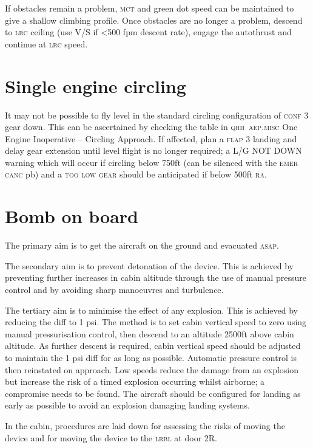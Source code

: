 \documentclass[a5paper,11pt,twoside]{book}
\newcommand{\ac}[1]{{\scshape\MakeLowercase{#1}}}
\newcommand{\inlcite}[1]{{\ac{#1}}}
\newcommand{\multicite}[1]{%
  \nopagebreak
  \noindent{{\color{blue}\footnotesize[ \inlcite{#1} ]}}
}
\begin{document}
If obstacles remain a problem, \ac{MCT} and green dot speed can be maintained to
give a shallow climbing profile. Once obstacles are no longer a problem, descend
to \ac{LRC} ceiling (use V/S if <500 fpm descent rate), engage the autothrust
and continue at \ac{LRC} speed.

\multicite{FCTM~PRO.AEP.ENG.EFDC}
\section{Single engine circling}

It may not be possible to fly level in the standard circling configuration of
\ac{CONF} 3 gear down. This can be ascertained by checking the table in
\inlcite{QRH~AEP.MISC} One Engine Inoperative – Circling Approach. If affected,
plan a \ac{FLAP} 3 landing and delay gear extension until level flight is no
longer required; a L/G NOT DOWN warning which will occur if circling below 750ft
(can be silenced with the \ac{EMER CANC} pb) and a \ac{TOO LOW GEAR} should be
anticipated if below 500ft \ac{RA}.

\multicite{QRH~AEP.MISC}

\section{Bomb on board}

The primary aim is to get the aircraft on the ground and evacuated \ac{ASAP}.

The secondary aim is to prevent detonation of the device. This is achieved by
preventing further increases in cabin altitude through the use of manual
pressure control and by avoiding sharp manoeuvres and turbulence.

The tertiary aim is to minimise the effect of any explosion. This is achieved by
reducing the diff to 1 psi. The method is to set cabin vertical speed to zero
using manual pressurisation control, then descend to an altitude 2500ft above
cabin altitude. As further descent is required, cabin vertical speed should be
adjusted to maintain the 1 psi diff for as long as possible. Automatic pressure
control is then reinstated on approach. Low speeds reduce the damage from an
explosion but increase the risk of a timed explosion occurring whilst airborne;
a compromise needs to be found. The aircraft should be configured for landing as
early as possible to avoid an explosion damaging landing systems.

In the cabin, procedures are laid down for assessing the risks of moving the
device and for moving the device to the \ac{LRBL} at door 2R.
\end{document}
